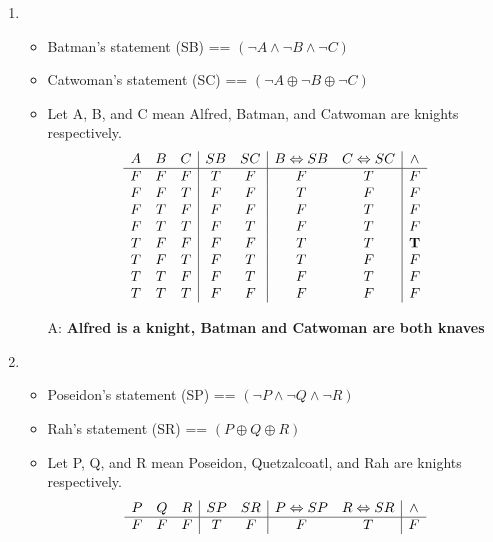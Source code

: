 \documentclass[11pt]{amsart}
\begin{document}
	\begin{sol}
		\begin{enumerate}
			\item
		 	\begin{itemize}
				\item Batman's statement (SB) == $(\neg A \wedge \neg B \wedge \neg C)$
				\item Catwoman's statement (SC) == $(\neg A \oplus \neg B \oplus \neg C)$
				\item Let A, B, and C mean Alfred, Batman, and Catwoman are knights respectively.
				\begin{displaymath}
				\begin{array}{c c c|c c|c c|c}
					A & B & C & SB & SC & B \Leftrightarrow SB & C \Leftrightarrow SC & \wedge\\
					\hline
					F & F & F & T & F & F & T & F\\
					F & F & T & F & F & T & F & F\\
					F & T & F & F & F & F & T & F\\
					F & T & T & F & T & F & T & F\\
					T & F & F & F & F & T & T & \mathbf{T}\\
					T & F & T & F & T & T & F & F\\
					T & T & F & F & T & F & T & F\\
					T & T & T & F & F & F & F & F\\
				\end{array}
				\end{displaymath}
				\item[A:] \bfseries{Alfred is a knight, Batman and Catwoman are both knaves}\\
			\end{itemize}
			\item
			\begin{itemize}
				\item Poseidon's statement (SP) == $(\neg P \wedge \neg Q \wedge \neg R)$
				\item Rah's statement (SR) == $(P \oplus Q \oplus R)$
				\item Let P, Q, and R mean  Poseidon, Quetzalcoatl, and Rah are knights respectively.
				\begin{displaymath}
				\begin{array}{c c c|c c|c c|c}
					P & Q & R & SP & SR & P \Leftrightarrow SP & R \Leftrightarrow SR & \wedge\\
					\hline
					F & F & F & T & F & F & T & F\\

\end{array}
\end{displaymath}
\end{itemize}
\end{enumerate}
\end{sol}
\end{document}
